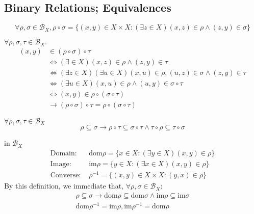 \subsection[4]{Binary Relations; Equivalences}


\begin{Def}
    \[
        \forall \rho, \sigma \in \mathcal{B}_X, \rho \circ \sigma =\{(x,y)\in X\times X: (\exists z\in X)(x,z)\in \rho \wedge (z,y)\in \sigma\}
    \]
\end{Def}

\begin{Prop}
    $\forall \rho, \sigma, \tau \in \mathcal{B}_X.$
    \begin{align*}
        (x,y) &\in (\rho \circ \sigma) \circ \tau   \\
        &\Leftrightarrow (\exists \in X)(x,z)\in \rho \wedge (z,y)\in \tau  \\
        &\Leftrightarrow (\exists z\in X)(\exists u \in X)(x,u)\in \rho,(u,z)\in \sigma \wedge (z,y) \in \tau   \\
        &\Leftrightarrow (\exists u \in X)(x,u)\in \rho \wedge (u,y)\in \sigma \circ \tau   \\
        &\Leftrightarrow (x,y)\in \rho \circ (\sigma \circ \tau)    \\
        &\rightarrow (\rho \circ \sigma) \circ \tau = \rho \circ (\sigma \circ \tau)
    \end{align*}
\end{Prop}

\begin{Rmk}
    $\forall \rho, \sigma, \tau \in \mathcal{B}_X$
    \[\rho \subseteq \sigma \rightarrow \rho \circ \tau \subseteq \sigma \circ \tau \wedge \tau \circ \rho \subseteq \tau \circ \sigma\]
\end{Rmk}

\begin{Def} in $\mathcal{B}_X$
    \begin{align*}
        \text{Domain: } & \mathrm{dom } \rho=\{x\in X: (\exists y\in X)(x,y)\in \rho\} \\
        \text{Image: } & \mathrm{im } \rho = \{y\in X:(\exists x\in X)(x,y)\in \rho\}  \\
        \text{Converse: } & \rho^{-1}=\{(x,y)\in X\times X: (y,x)\in \rho\}
    \end{align*}
    By this definition, we immediate that, $\forall \rho,\sigma\in \mathcal{B}_X$:
    \begin{align*}
        \rho \subseteq \sigma \rightarrow \mathrm{dom } \rho \subseteq \mathrm{dom }\sigma \wedge \mathrm{im }\rho \subseteq \mathrm{im } \sigma    \\
        \mathrm{dom }\rho^{-1}=\mathrm{im }\rho, \mathrm{im }\rho^{-1}=\mathrm{dom }\rho
    \end{align*}
\end{Def}

